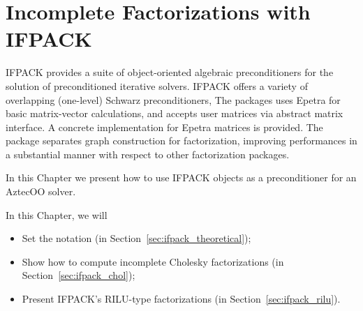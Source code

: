 % 
% 
% 
%   
%   
% 
% 

\section{Incomplete Factorizations with IFPACK}
\label{chap:ifpack}

IFPACK provides a suite of object-oriented algebraic preconditioners for
the solution of preconditioned iterative solvers. IFPACK offers a
variety of overlapping (one-level) Schwarz preconditioners, The packages
uses Epetra for basic matrix-vector calculations, and accepts user
matrices via abstract matrix interface. A concrete implementation for
Epetra matrices is provided. The package separates graph construction
for factorization, improving performances in a substantial manner with
respect to other factorization packages.

In this Chapter we present how to use IFPACK objects as a preconditioner
for an AztecOO solver. 

In this Chapter, we will
\begin{itemize}
\item Set the notation (in Section~\ref{sec:ifpack_theoretical});
\item Show how to compute incomplete Cholesky factorizations (in
  Section~\ref{sec:ifpack_chol});
\item Present IFPACK's RILU-type factorizations (in
  Section~\ref{sec:ifpack_rilu}).
\end{itemize}

